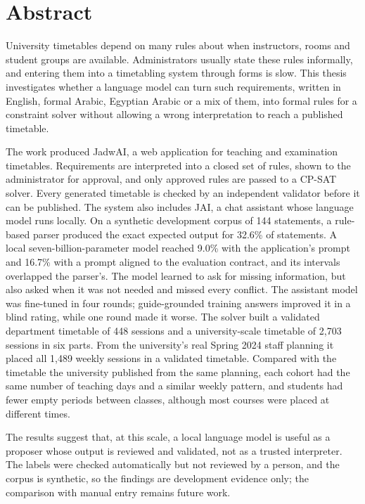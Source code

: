 \chapter*{Abstract}
\label{chap:abstract}

University timetables depend on many rules about when instructors, rooms and student groups are available. Administrators usually state these rules informally, and entering them into a timetabling system through forms is slow. This thesis investigates whether a language model can turn such requirements, written in English, formal Arabic, Egyptian Arabic or a mix of them, into formal rules for a constraint solver without allowing a wrong interpretation to reach a published timetable.

The work produced JadwAI, a web application for teaching and examination timetables. Requirements are interpreted into a closed set of rules, shown to the administrator for approval, and only approved rules are passed to a CP-SAT solver. Every generated timetable is checked by an independent validator before it can be published. The system also includes JAI, a chat assistant whose language model runs locally. On a synthetic development corpus of 144 statements, a rule-based parser produced the exact expected output for 32.6\% of statements. A local seven-billion-parameter model reached 9.0\% with the application's prompt and 16.7\% with a prompt aligned to the evaluation contract, and its intervals overlapped the parser's. The model learned to ask for missing information, but also asked when it was not needed and missed every conflict. The assistant model was fine-tuned in four rounds; guide-grounded training answers improved it in a blind rating, while one round made it worse. The solver built a validated department timetable of 448 sessions and a university-scale timetable of 2{,}703 sessions in six parts. From the university's real Spring 2024 staff planning it placed all 1{,}489 weekly sessions in a validated timetable. Compared with the timetable the university published from the same planning, each cohort had the same number of teaching days and a similar weekly pattern, and students had fewer empty periods between classes, although most courses were placed at different times.

The results suggest that, at this scale, a local language model is useful as a proposer whose output is reviewed and validated, not as a trusted interpreter. The labels were checked automatically but not reviewed by a person, and the corpus is synthetic, so the findings are development evidence only; the comparison with manual entry remains future work.
